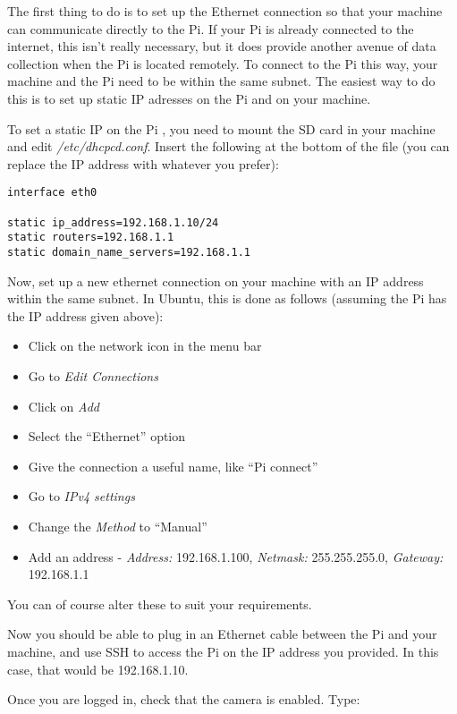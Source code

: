\documentclass[10pt]{article}
\begin{document}
The first thing to do is to set up the Ethernet connection so that your machine can communicate directly to the Pi. If your Pi is already connected to the internet, this
isn't really necessary, but it does provide another avenue of data collection when the Pi is located remotely. To connect to the Pi this way, your machine and the Pi 
need to be within the same subnet. The easiest way to do this is to set up static IP adresses on the Pi and on your machine.

To set a static IP on the Pi , you need to mount the SD card in your machine and edit \textit{/etc/dhcpcd.conf}. Insert the following at the bottom of the file (you can 
replace the IP address with whatever you prefer):

\begin{verbatim}
interface eth0

static ip_address=192.168.1.10/24
static routers=192.168.1.1
static domain_name_servers=192.168.1.1
\end{verbatim}

Now, set up a new ethernet connection on your machine with an IP address within the same subnet. In Ubuntu, this is done as follows (assuming the Pi has the IP address
given above):

\begin{itemize}
 \item Click on the network icon in the menu bar
 \item Go to \textit{Edit Connections}
 \item Click on \textit{Add}
 \item Select the ``Ethernet'' option
 \item Give the connection a useful name, like ``Pi connect''
 \item Go to \textit{IPv4 settings}
 \item Change the \textit{Method} to ``Manual''
 \item Add an address - \textit{Address:} 192.168.1.100, \textit{Netmask:} 255.255.255.0, \textit{Gateway:} 192.168.1.1
\end{itemize}

You can of course alter these to suit your requirements.

Now you should be able to plug in an Ethernet cable between the Pi and your machine, and use SSH to access the Pi on the IP address you provided. In this case, that 
would be 192.168.1.10.

Once you are logged in, check that the camera is enabled. Type:
\end{document}

